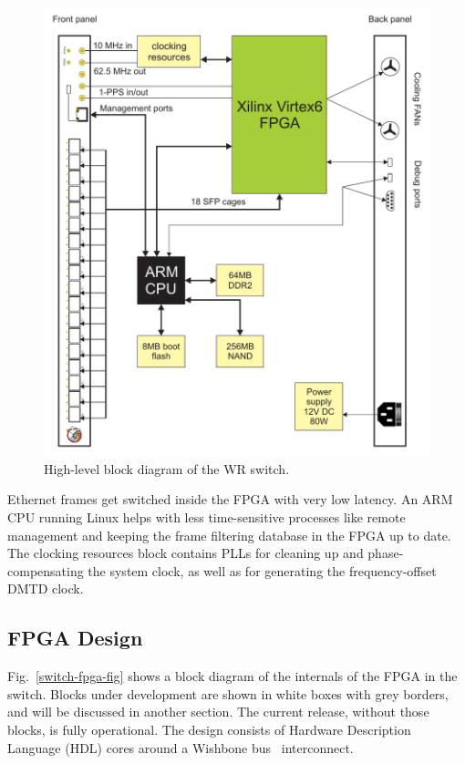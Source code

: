 \documentclass{../JAC2003}
\begin{document}
\begin{figure}[htb]
   \centering
   \includegraphics*[width=0.7\columnwidth]{switch/switch_simple_diagram.pdf}
   \caption{High-level block diagram of the WR switch.}
   \label{switch-top-fig}
\end{figure}

Ethernet frames get switched inside the FPGA with very low latency. An
ARM CPU running Linux helps with less time-sensitive processes like
remote management and keeping the frame filtering database in the FPGA
up to date. The clocking resources block contains PLLs for cleaning up
and phase-compensating the system clock, as well as for generating the
frequency-offset DMTD clock.

\subsection{FPGA Design} 

Fig.~\ref{switch-fpga-fig} shows a block diagram of the internals of
the FPGA in the switch. Blocks under development are shown in white
boxes with grey borders, and will be discussed in another section. The
current release, without those blocks, is fully operational. The
design consists of Hardware Description Language (HDL) cores around a
Wishbone bus~\cite{wishbone-ref} interconnect.
\end{document}

